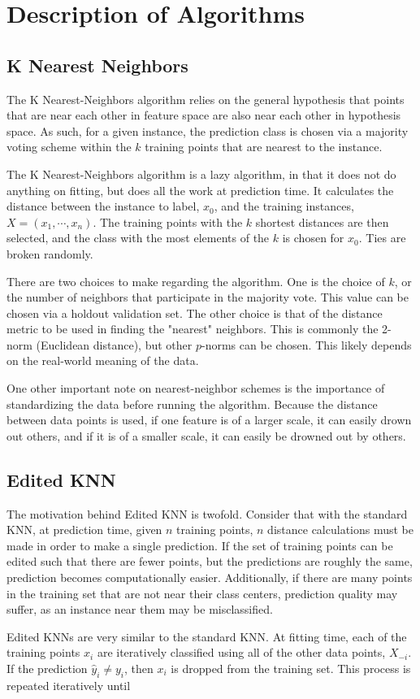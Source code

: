 \documentclass{amsart}
\begin{document}
    \section{Description of Algorithms}
    \subsection*{K Nearest Neighbors}
    The K Nearest-Neighbors algorithm relies on the general hypothesis that points
    that are near each other in feature space are also near each other in hypothesis space.
    As such, for a given instance, the prediction class is chosen via a majority
    voting scheme within the $k$ training points that are nearest to the instance.

    The K Nearest-Neighbors algorithm is a lazy algorithm, in that it does not
    do anything on fitting, but does all the work at prediction time. It calculates the
    distance between the instance to label, $x_0$, and the training instances, $X = (x_1, \cdots, x_n)$.
    The training points with the $k$ shortest distances are then selected, and the class with the
    most elements of the $k$ is chosen for $x_0$. Ties are broken randomly.

    There are two choices to make regarding the algorithm. One is the choice of $k$, or the number
    of neighbors that participate in the majority vote. This value can be chosen via
    a holdout validation set. The other choice is that of the distance metric to be used in
    finding the "nearest" neighbors. This is commonly the 2-norm (Euclidean distance), but
    other $p$-norms can be chosen. This likely depends on the real-world meaning of the data.

    One other important note on nearest-neighbor schemes is the importance of
    standardizing the data before running the algorithm. Because the distance between
    data points is used, if one feature is of a larger scale, it can easily drown out others, and
    if it is of a smaller scale, it can easily be drowned out by others.

    \subsection*{Edited KNN}
    The motivation behind Edited KNN is twofold. Consider that with the standard KNN, at
    prediction time, given $n$ training points, $n$ distance calculations must be made in order
    to make a single prediction. If the set of training points can be edited such that there are
    fewer points, but the predictions are roughly the same, prediction becomes computationally easier.
    Additionally, if there are many points in the training set that are not near their class
    centers, prediction quality may suffer, as an instance near them may be misclassified.

    Edited KNNs\cite{edited_knn} are very similar to the standard KNN. At fitting time, each of the
    training points $x_i$ are iteratively classified using all of the other data points, $X_{-i}$.
    If the prediction $\hat{y}_i \neq y_i$, then $x_i$ is dropped from the training set. This process
    is repeated iteratively until




\end{document}
